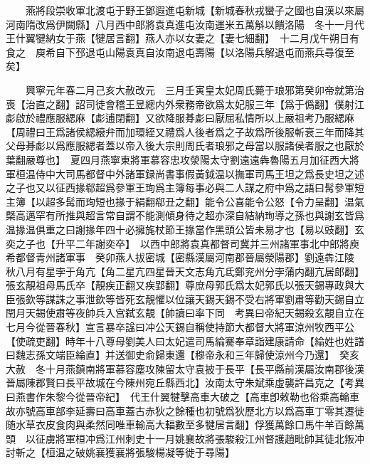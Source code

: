 　　燕將段崇收軍北渡屯于野王鄧遐進屯新城【新城春秋戎蠻子之國也自漢以來屬河南隋改爲伊闕縣】八月西中郎將袁真進屯汝南運米五萬斛以饋洛陽　冬十一月代王什翼犍納女于燕【犍居言翻】燕人亦以女妻之【妻七細翻】　十二月戊午朔日有食之　庾希自下邳退屯山陽袁真自汝南退屯壽陽【以洛陽兵解退屯而燕兵尋復至矣】

　　興寧元年春二月己亥大赦改元　三月壬寅皇太妃周氏薨于琅邪第癸卯帝就第治喪【治直之翻】詔司徒會稽王昱總内外衆務帝欲爲太妃服三年【爲于僞翻】僕射江虨啟於禮應服緦麻【虨逋閉翻】又欲降服朞虨曰厭屈私情所以上嚴祖考乃服緦麻【周禮曰王爲諸侯緦縗弁而加環絰又禮爲人後者爲之子故爲所後服斬衰三年而降其父母朞虨以爲應服緦者蓋以帝入後大宗則周氏者琅邪之母當以服諸侯者服之也厭於葉翻嚴尊也】　夏四月燕寧東將軍慕容忠攻滎陽太守劉遠遠犇魯陽五月加征西大將軍桓温侍中大司馬都督中外諸軍録尚書事假黃鉞温以撫軍司馬王坦之爲長史坦之述之子也又以征西掾郗超爲參軍王珣爲主簿每事必與二人謀之府中爲之語曰髯參軍短主簿【以超多髯而珣短也掾于絹翻郗丑之翻】能令公喜能令公怒【令力呈翻】温氣槩高邁罕有所推與超言常自謂不能測傾身待之超亦深自結納珣導之孫也與謝玄皆爲温掾温俱重之曰謝掾年四十必擁旄杖節王掾當作黑頭公皆未易才也【易以豉翻】玄奕之子也【升平二年謝奕卒】　以西中郎將袁真都督司冀并三州諸軍事北中郎將庾希都督青州諸軍事　癸卯燕人拔密城【密縣漢屬河南郡晉屬滎陽郡】劉遠犇江陵　秋八月有星孛于角亢【角二星亢四星晉天文志角亢氐鄭兖州分孛蒲内翻亢居郎翻】　張玄靚祖母馬氏卒【靚疾正翻又疾郢翻】尊庶母郭氏爲太妃郭氏以張天錫專政與大臣張欽等謀誅之事泄欽等皆死玄靚懼以位讓天錫天錫不受右將軍劉肅等勸天錫自立閏月天錫使肅等夜帥兵入宫弑玄靚【帥讀曰率下同　考異曰帝紀天錫殺玄靚自立在七月今從晉春秋】宣言暴卒諡曰冲公天錫自稱使持節大都督大將軍涼州牧西平公【使疏吏翻】時年十八尊母劉美人曰太妃遣司馬綸騫奉章詣建康請命【綸姓也姓譜曰魏志孫文端臣綸直】并送御史俞歸東還【穆帝永和三年歸使涼州今乃還】　癸亥大赦　冬十月燕鎮南將軍慕容塵攻陳留太守袁披于長平【長平縣前漢屬汝南郡後漢晉屬陳郡賢曰長平故城在今陳州宛丘縣西北】汝南太守朱斌乘虛襲許昌克之【考異曰燕書作朱黎今從晉帝紀】　代王什翼犍擊高車大破之【高車卽敕勒也俗乘高輪車故亦號高車部李延壽曰高車蓋古赤狄之餘種也初號爲狄歷北方以爲高車丁零其遷徙随水草衣皮食肉與柔然同唯車輸高大輻數至多犍居言翻】俘獲萬餘口馬牛羊百餘萬頭　以征虜將軍桓冲爲江州刺史十一月姚襄故將張駿殺江州督護趙毗帥其徒北叛冲討斬之【桓温之破姚襄獲襄將張駿楊凝等徙于尋陽】

